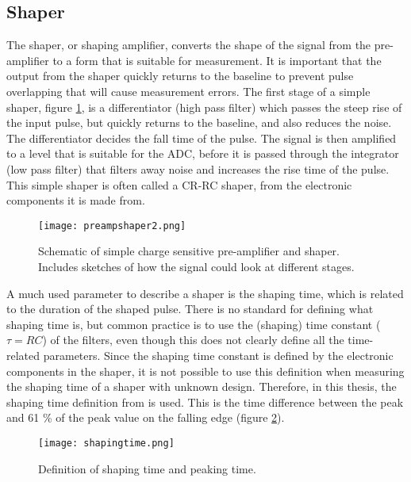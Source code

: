 \documentclass[../main/thesis.tex]{subfiles}
\begin{document}
\subsection{Shaper}
\label{t-shaper}
The shaper, or shaping amplifier, converts the shape of the signal from the pre-amplifier to a form that is suitable for measurement.  It is important that the output from the shaper quickly returns to the baseline to prevent pulse overlapping that will cause measurement errors. The first stage of a simple shaper, figure \ref{fig-preampshaper}, is a differentiator (high pass filter) which passes the steep rise of the input pulse, but quickly returns to the baseline, and also reduces the noise. The differentiator decides the fall time of the pulse. The signal is then amplified to a level that is suitable for the \gls{ADC}, before it is passed through the integrator (low pass filter) that filters away noise and increases the rise time of the pulse. This simple shaper is often called a CR-RC shaper, from the electronic components it is made from. \citep[chap. 16]{Knoll}

\begin{figure}%
	\centering
	\texttt{[image: preampshaper2.png]}
	\caption{Schematic of simple charge sensitive pre-amplifier and shaper. Includes sketches of how the signal could look at different stages. \citep[chap. 16]{Knoll} }
	\label{fig-preampshaper}
\end{figure} %

A much used parameter to describe a shaper is the shaping time, which is related to the duration of the shaped pulse. There is no standard for defining what shaping time is, but common practice is to use the (shaping) time constant ($\tau=RC$) of the filters, even though this does not clearly define all the time-related parameters. \citep[chap. 17]{Knoll} Since the shaping time constant is defined by the electronic components in the shaper, it is not possible to use this definition when measuring the shaping time of a shaper with unknown design. Therefore, in this thesis, the shaping time definition from \citep{shapingtimedef} is used. This is the time difference between the peak and 61 \% of the peak value on the falling edge (figure \ref{fig-shapingtime-def}).  

\begin{figure}%
	\centering
	\texttt{[image: shapingtime.png]}
	\caption{Definition of shaping time and peaking time. \citep{shapingtimedef} }
	\label{fig-shapingtime-def}
\end{figure}
\end{document}
